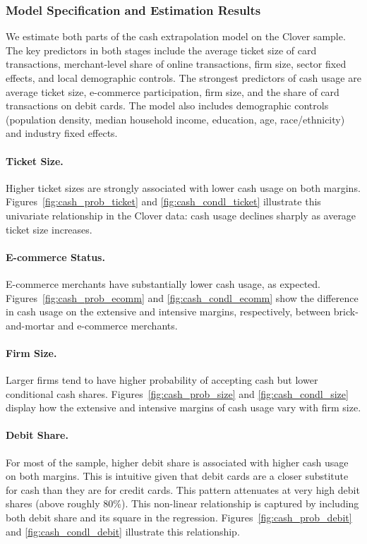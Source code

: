 \documentclass[main.tex]{subfiles}
\begin{document}
\subsubsection{Model Specification and Estimation Results}

We estimate both parts of the cash extrapolation model on the Clover sample.
The key predictors in both stages include the average ticket size of card transactions, merchant-level share of online transactions, firm size, sector fixed effects, and local demographic controls.
The strongest predictors of cash usage are average ticket size, e-commerce participation, firm size, and the share of card transactions on debit cards.
The model also includes demographic controls (population density, median household income, education, age, race/ethnicity) and industry fixed effects.

\paragraph{Ticket Size.} Higher ticket sizes are strongly associated with lower cash usage on both margins. Figures~\ref{fig:cash_prob_ticket} and \ref{fig:cash_condl_ticket} illustrate this univariate relationship in the Clover data: cash usage declines sharply as average ticket size increases.

\paragraph{E-commerce Status.} E-commerce merchants have substantially lower cash usage, as expected. Figures~\ref{fig:cash_prob_ecomm} and \ref{fig:cash_condl_ecomm} show the difference in cash usage on the extensive and intensive margins, respectively, between brick-and-mortar and e-commerce merchants.

\paragraph{Firm Size.} Larger firms tend to have higher probability of accepting cash but lower conditional cash shares. Figures~\ref{fig:cash_prob_size} and \ref{fig:cash_condl_size} display how the extensive and intensive margins of cash usage vary with firm size.

\paragraph{Debit Share.} For most of the sample, higher debit share is associated with higher cash usage on both margins. This is intuitive given that debit cards are a closer substitute for cash than they are for credit cards. This pattern attenuates at very high debit shares (above roughly 80\%). This non-linear relationship is captured by including both debit share and its square in the regression. Figures~\ref{fig:cash_prob_debit} and \ref{fig:cash_condl_debit} illustrate this relationship.
\end{document}
